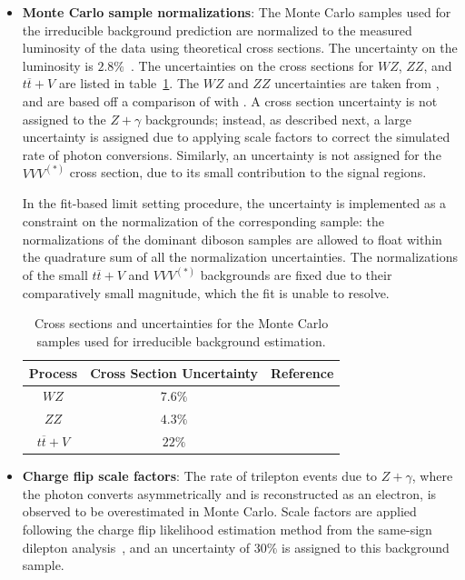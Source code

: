 \begin{itemize}
	\item \textbf{Monte Carlo sample normalizations}: The Monte Carlo samples used for the irreducible background prediction are normalized to the measured luminosity of the data using theoretical cross sections. The uncertainty on the luminosity is $2.8\%$~\cite{luminosity}. The uncertainties on the cross sections for $WZ$, $ZZ$, and $t\overline{t}+V$ are listed in table~\ref{table:mc-cross-section-uncertainties}. The $WZ$ and $ZZ$ uncertainties are taken from \cite{DeViveiros:1670929}, and are based off a comparison of \sherpa with \vbfnlo. A cross section uncertainty is not assigned to the $Z+\gamma$ backgrounds; instead, as described next, a large uncertainty is assigned due to applying scale factors to correct the simulated rate of photon conversions. Similarly, an uncertainty is not assigned for the $VVV^{(*)}$ cross section, due to its small contribution to the signal regions. 

	In the fit-based limit setting procedure, the uncertainty is implemented as a constraint on the normalization of the corresponding sample: the normalizations of the dominant diboson samples are allowed to float within the quadrature sum of all the normalization uncertainties. The normalizations of the small $t\overline{t}+V$ and $VVV^{(*)}$ backgrounds are fixed due to their comparatively small magnitude, which the fit is unable to resolve. 

	\begin{table}[h]
		\centering
		\begin{tabular}{ccc}
			Process & Cross Section Uncertainty & Reference \\
			\hline
			$WZ$ & $7.6\%$ & \cite{DeViveiros:1670929}\\
			$ZZ$ & $4.3\%$ & \cite{DeViveiros:1670929} \\
			$t\overline{t}+V$ & $22\%$ & \cite{ttV} \\
		\end{tabular}	
		\caption{Cross sections and uncertainties for the Monte Carlo samples used for irreducible background estimation.}
		\label{table:mc-cross-section-uncertainties}
	\end{table}

	\item \textbf{Charge flip scale factors}: The rate of trilepton events due to $Z+\gamma$, where the photon converts asymmetrically and is reconstructed as an electron, is observed to be overestimated in Monte Carlo. Scale factors are applied following the charge flip likelihood estimation method from the same-sign dilepton analysis~\cite{DeViveiros:1670929}, and an uncertainty of $30\%$ is assigned to this background sample.


\end{itemize}
